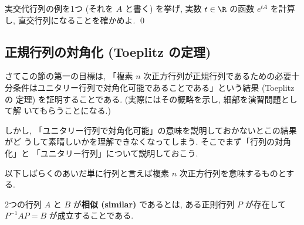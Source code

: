 \documentclass[12pt,twoside]{jarticle}
\begin{document}
\begin{question}
  実交代行列の例を1つ (それを $A$ と書く) を挙げ, 
  実数 $t\in\R$ の函数 $e^{tA}$ を計算し, 直交行列になることを確かめよ.
  \qed
\end{question}


\subsection{正規行列の対角化 (Toeplitz の定理)}


さてこの節の第一の目標は, 「複素 $n$ 次正方行列が正規行列であるための必要十
分条件はユニタリー行列で対角化可能であることである」という結果 (Toeplitz の
定理) を証明することである.  (実際にはその概略を示し, 細部を演習問題として解
いてもらうことになる.)

しかし, 「ユニタリー行列で対角化可能」の意味を説明しておかないとこの結果がど
うして素晴しいかを理解できなくなってしまう.  そこでまず「行列の対角化」と
「ユニタリー行列」について説明しておこう.

以下しばらくのあいだ単に行列と言えば複素 $n$ 次正方行列を意味するものとする.

2つの行列 $A$ と $B$ が{\bf 相似 (similar)} であるとは, 
ある正則行列 $P$ が存在して $P^{-1}AP = B$ が成立することである.
\end{document}
